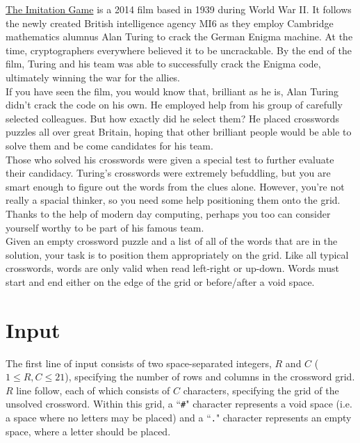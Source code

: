 

\noindent \href{https://www.imdb.com/title/tt2084970/}{The Imitation Game} is a 2014 film based in 1939 during World War II. It follows the newly created British intelligence agency MI6 as they  employ Cambridge mathematics alumnus Alan Turing to crack the German Enigma machine. At the time, cryptographers everywhere believed it to be uncrackable. By the end of the film,  Turing and his team was able to successfully crack the Enigma code, ultimately winning the war for the allies.\\

If you have seen the film, you would know that, brilliant as he is, Alan Turing didn't crack the code on his own. He employed help from his group of carefully selected colleagues. But how exactly did he select them? He placed crosswords puzzles all over great Britain, hoping that other brilliant people would be able to solve them and be come candidates for his team.\\

Those who solved his crosswords were given a special test to further evaluate their candidacy. Turing's crosswords were extremely befuddling, but you are smart enough to figure out the words from the clues alone. However, you're not really a spacial thinker, so you need some help positioning them onto the grid. Thanks to the help of modern day computing, perhaps you too can consider yourself worthy to be part of his famous team.\\

Given an empty crossword puzzle and a list of all of the words that are in the solution, your task is to position them appropriately on the grid. Like all typical crosswords, words are only valid when read left-right or up-down. Words must start and end either on the edge of the grid or before/after a void space.

\section*{Input}

\noindent The first line of input consists of two space-separated integers, $R$ and $C$ ($1 \leq R, C \leq 21$), specifying the number of rows and columns in the crossword grid.\\

\noindent $R$ line follow, each of which consists of $C$ characters, specifying the grid of the unsolved crossword. Within this grid, a ``\texttt{\#}" character represents a void space (i.e. a space where no letters may be placed) and a ``\texttt{.}" character represents an empty space, where a letter should be placed.\\


